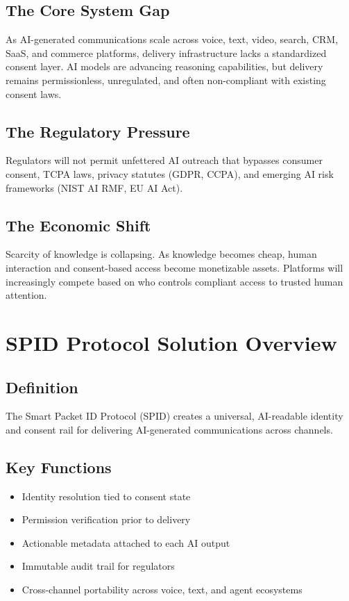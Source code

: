 \documentclass[conference]{IEEEtran}
\begin{document}
\subsection{The Core System Gap}
As AI-generated communications scale across voice, text, video, search, CRM, SaaS, and commerce platforms, delivery infrastructure lacks a standardized consent layer. AI models are advancing reasoning capabilities, but delivery remains permissionless, unregulated, and often non-compliant with existing consent laws.

\subsection{The Regulatory Pressure}
Regulators will not permit unfettered AI outreach that bypasses consumer consent, TCPA laws, privacy statutes (GDPR, CCPA), and emerging AI risk frameworks (NIST AI RMF, EU AI Act).

\subsection{The Economic Shift}
Scarcity of knowledge is collapsing. As knowledge becomes cheap, human interaction and consent-based access become monetizable assets. Platforms will increasingly compete based on who controls compliant access to trusted human attention.

\section{SPID Protocol Solution Overview}

\subsection{Definition}
The Smart Packet ID Protocol (SPID) creates a universal, AI-readable identity and consent rail for delivering AI-generated communications across channels.

\subsection{Key Functions}
\begin{itemize}
    \item Identity resolution tied to consent state
    \item Permission verification prior to delivery
    \item Actionable metadata attached to each AI output
    \item Immutable audit trail for regulators
    \item Cross-channel portability across voice, text, and agent ecosystems
\end{itemize}
\end{document}
